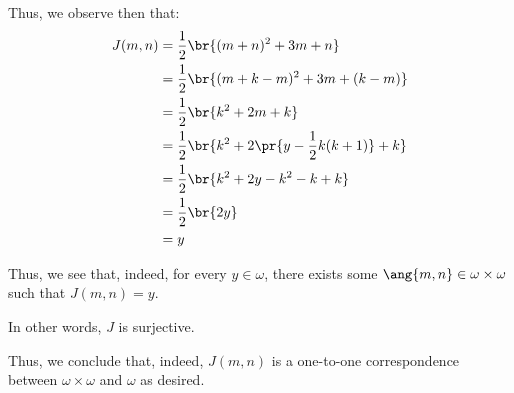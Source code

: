 \documentclass{article}
\begin{document}
\begin{solution}
 	Thus, we observe then that:
 	\begin{align*}
 		J(m,n) &= \frac{1}{2}\br{(m+n)^{2} + 3m + n} \\
 		&= \frac{1}{2}\br{(m + k - m)^{2} + 3m + (k-m)} \\
 		&= \frac{1}{2}\br{k^{2} + 2m + k} \\
 		&= \frac{1}{2}\br{k^{2} + 2\pr{y - \frac{1}{2}k(k+1)} + k} \\
 		&= \frac{1}{2}\br{k^{2} + 2y -k^{2} - k + k} \\
 		&= \frac{1}{2}\br{2y} \\
 		&= y
 	\end{align*}
 
 	Thus, we see that, indeed, for every $y \in \omega$, there exists some $\ang{m,n} \in \omega \times \omega$ such that $J(m,n) = y$.
 	
 	In other words, $J$ is surjective.
 	
 	Thus, we conclude that, indeed, $J(m,n)$ is a one-to-one correspondence between $\omega \times \omega$ and $\omega$ as desired.
\end{solution}
\end{document}
